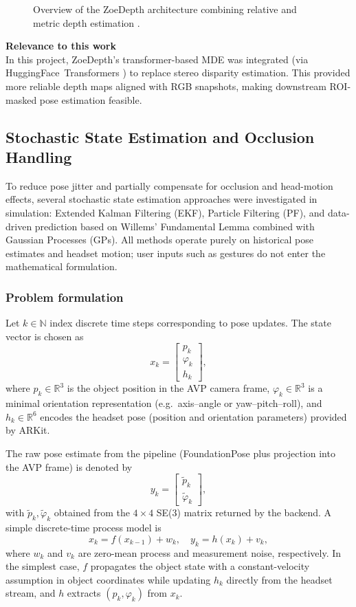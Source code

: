 \begin{figure}[ht]
    \centering
    \caption[ZoeDepth architecture overview]{Overview of the ZoeDepth architecture combining relative and metric depth estimation \cite{bhat2023zoedepth}.}
    \label{fig:zoedepth}
\end{figure}

\textbf{Relevance to this work} \\
In this project, ZoeDepth’s transformer-based MDE was integrated (via HuggingFace~Transformers \cite{transformers-model}) to replace stereo disparity estimation. This provided more reliable depth maps aligned with RGB snapshots, making downstream ROI-masked pose estimation feasible.

\subsection{Stochastic State Estimation and Occlusion Handling}
\label{appendix:willems}

To reduce pose jitter and partially compensate for occlusion and head-motion effects, several stochastic state estimation approaches were investigated in simulation: Extended Kalman Filtering (EKF), Particle Filtering (PF), and data-driven prediction based on Willems’ Fundamental Lemma combined with Gaussian Processes (GPs). All methods operate purely on historical pose estimates and headset motion; user inputs such as gestures do not enter the mathematical formulation.

\subsubsection*{Problem formulation}

Let $k \in \mathbb{N}$ index discrete time steps corresponding to pose updates. The state vector is chosen as
\[
x_k =
\begin{bmatrix}
p_k \\
\varphi_k \\
h_k
\end{bmatrix},
\]
where $p_k \in \mathbb{R}^3$ is the object position in the AVP camera frame, $\varphi_k \in \mathbb{R}^3$ is a minimal orientation representation (e.g.\ axis–angle or yaw–pitch–roll), and $h_k \in \mathbb{R}^6$ encodes the headset pose (position and orientation parameters) provided by ARKit.

The raw pose estimate from the pipeline (FoundationPose plus projection into the AVP frame) is denoted by
\[
y_k =
\begin{bmatrix}
\tilde{p}_k \\
\tilde{\varphi}_k
\end{bmatrix},
\]
with $\tilde{p}_k, \tilde{\varphi}_k$ obtained from the $4 \times 4$ SE(3) matrix returned by the backend. A simple discrete-time process model is
\[
x_k = f(x_{k-1}) + w_k,
\quad
y_k = h(x_k) + v_k,
\]
where $w_k$ and $v_k$ are zero-mean process and measurement noise, respectively. In the simplest case, $f$ propagates the object state with a constant-velocity assumption in object coordinates while updating $h_k$ directly from the headset stream, and $h$ extracts $(p_k,\varphi_k)$ from $x_k$.

